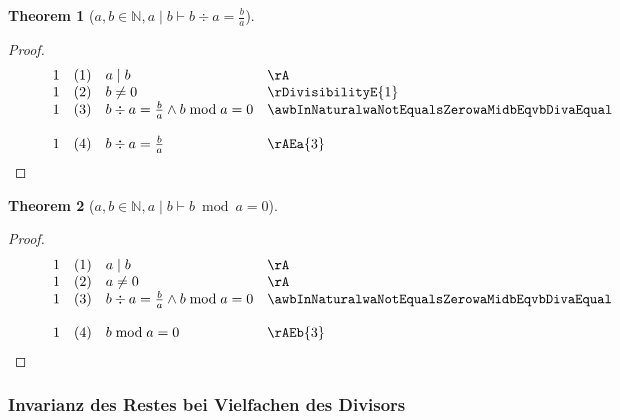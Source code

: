 \documentclass{book}
\theoremstyle{plain}
\newtheorem{theorem}{Theorem}
\theoremstyle{remark}
\theoremstyle{definition}
\begin{document}
\label{awbInNaturalwaMidbImpbDivaEqualsLpbRpDurchLpaRp}
\begin{theorem}[\(a,b\in\mathbb{N},a\mid b\vdash b\div a=\frac{b}{a}\)]
\end{theorem}
\begin{proof}
    \[
	\begin{array}{llcll p{5cm}}
            1 &  (1)  & \multicolumn{3}{l}{a\mid b} & \rA \\
            1 &  (2)  & \multicolumn{3}{l}{b\neq 0} & \rDivisibilityE{1} \\
            1 &  (3)  & \multicolumn{3}{l}{b\div a=\frac{b}{a}\land b\bmod a=0} & \awbInNaturalwaNotEqualsZerowaMidbEqvbDivaEqualsLpbRpDurchLpaRpAndbModaEqualsZero{1,2} \\
            1 &  (4)  & \multicolumn{3}{l}{b\div a=\frac{b}{a}} & \rAEa{3} \\
        \end{array}
    \]
\end{proof}

\label{awbInNaturalwaMidbImpbModaEqualsZero}
\begin{theorem}[\(a,b\in\mathbb{N},a\mid b\vdash b\bmod a=0\)]
\end{theorem}
\begin{proof}
    \[
	\begin{array}{llcll p{5cm}}
            1 &  (1)  & \multicolumn{3}{l}{a\mid b} & \rA \\
            1 &  (2)  & \multicolumn{3}{l}{a\neq 0} & \rA \\
            1 &  (3)  & \multicolumn{3}{l}{b\div a=\frac{b}{a}\land b\bmod a=0} & \awbInNaturalwaNotEqualsZerowaMidbEqvbDivaEqualsLpbRpDurchLpaRpAndbModaEqualsZero{1,2} \\
            1 &  (4)  & \multicolumn{3}{l}{b\bmod a=0} & \rAEb{3} \\
        \end{array}
    \]
\end{proof}

\subsubsection{Invarianz des Restes bei Vielfachen des Divisors}
\end{document}
